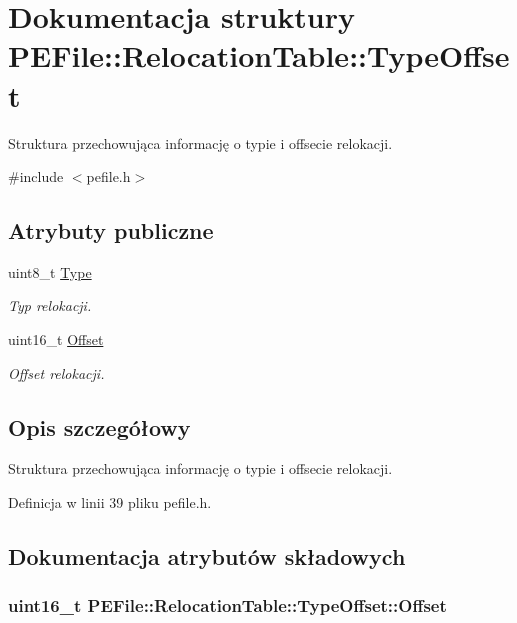 \hypertarget{struct_p_e_file_1_1_relocation_table_1_1_type_offset}{\section{Dokumentacja struktury P\-E\-File\-:\-:Relocation\-Table\-:\-:Type\-Offset}
\label{struct_p_e_file_1_1_relocation_table_1_1_type_offset}
}


Struktura przechowująca informację o typie i offsecie relokacji.  




{\ttfamily \#include $<$pefile.\-h$>$}

\subsection*{Atrybuty publiczne}
\begin{DoxyCompactItemize}
\item 
uint8\-\_\-t \hyperlink{struct_p_e_file_1_1_relocation_table_1_1_type_offset_a1d812b2e05780019bb9bb44d6fb1a3db}{Type}
\begin{DoxyCompactList}\small\item\em Typ relokacji. \end{DoxyCompactList}\item 
uint16\-\_\-t \hyperlink{struct_p_e_file_1_1_relocation_table_1_1_type_offset_a5b5bdeee7b3fae781cbbc48242dfc453}{Offset}
\begin{DoxyCompactList}\small\item\em Offset relokacji. \end{DoxyCompactList}\end{DoxyCompactItemize}


\subsection{Opis szczegółowy}
Struktura przechowująca informację o typie i offsecie relokacji. 

Definicja w linii 39 pliku pefile.\-h.



\subsection{Dokumentacja atrybutów składowych}
\hypertarget{struct_p_e_file_1_1_relocation_table_1_1_type_offset_a5b5bdeee7b3fae781cbbc48242dfc453}{
\subsubsection[{Offset}]{\setlength{\rightskip}{0pt plus 5cm}uint16\-\_\-t P\-E\-File\-::\-Relocation\-Table\-::\-Type\-Offset\-::\-Offset}}\label{struct_p_e_file_1_1_relocation_table_1_1_type_offset_a5b5bdeee7b3fae781cbbc48242dfc453}


